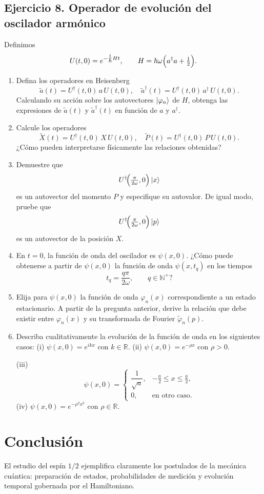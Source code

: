 \documentclass[a4paper,11pt]{article}
\begin{document}
\subsection*{Ejercicio 8. Operador de evolución del oscilador armónico}

Definimos  
\[
U(t,0)=e^{-\tfrac{i}{\hbar}Ht},\qquad
H=\hbar\omega\Bigl(a^\dagger a + \tfrac12\Bigr).
\]

\begin{enumerate}
\item Defina los operadores en Heisenberg
\[
\widetilde a(t)=U^\dagger(t,0)\,a\,U(t,0),\quad
\widetilde a^\dagger(t)=U^\dagger(t,0)\,a^\dagger\,U(t,0).
\]
Calculando su acción sobre los autovectores \(\ket{\varphi_n}\) de \(H\), obtenga las expresiones de \(\widetilde a(t)\) y \(\widetilde a^\dagger(t)\) en función de \(a\) y \(a^\dagger\).

\item Calcule los operadores  
\[
\widetilde X(t)=U^\dagger(t,0)\,X\,U(t,0),\quad
\widetilde P(t)=U^\dagger(t,0)\,P\,U(t,0).
\]
¿Cómo pueden interpretarse físicamente las relaciones obtenidas?

\item Demuestre que  
\[
U^\dagger\!\Bigl(\tfrac{\pi}{2\omega},0\Bigr)\ket{x}
\]
es un autovector del momento \(P\) y especifique su autovalor.  
De igual modo, pruebe que  
\[
U^\dagger\!\Bigl(\tfrac{\pi}{2\omega},0\Bigr)\ket{p}
\]
es un autovector de la posición \(X\).

\item  En \(t=0\), la función de onda del oscilador es \(\psi(x,0)\). ¿Cómo puede obtenerse a partir de \(\psi(x,0)\) la función de onda \(\psi(x,t_q)\) en los tiempos  
\[
t_q = \frac{q\pi}{2\omega},\qquad q\in\mathbb{N}^+?
\]

\item  Elija para \(\psi(x,0)\) la función de onda \(\varphi_n(x)\) correspondiente a un estado estacionario. A partir de la pregunta anterior, derive la relación que debe existir entre \(\varphi_n(x)\) y su transformada de Fourier \(\widetilde\varphi_n(p)\).

\item  Describa cualitativamente la evolución de la función de onda en los siguientes casos:  
(i) \(\psi(x,0)=e^{ikx}\) con \(k\in\mathbb{R}\).  
(ii) \(\psi(x,0)=e^{-\rho x}\) con \(\rho>0\).

(iii) \[
\psi(x,0)=
\begin{cases}
\dfrac{1}{\sqrt a}, & -\tfrac a2 \le x \le \tfrac a2,\\
0,                   & \text{en otro caso}.
\end{cases}
\]
(iv) \(\psi(x,0)=e^{-\rho^2 x^2}\) con \(\rho\in\mathbb{R}\).

\end{enumerate}

\section*{Conclusión}
El estudio del espín $1/2$ ejemplifica claramente los postulados de la mecánica cuántica: preparación de estados, probabilidades de medición y evolución temporal gobernada por el Hamiltoniano.
\end{document}
